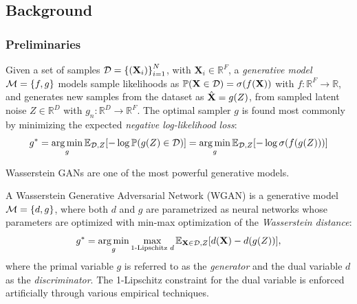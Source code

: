 
\subsection{Background}
\label{sec:background_gggcrp}

\subsubsection{Preliminaries}

\begin{definition}
    Given a set of samples $\mathcal{D}=\mathopen{}\left\{\mathopen{}\left(\mathbf{X}_i\right)\right\}_{i=1}^{N}$, with $\mathbf{X}_i \in \mathbb{R}^F$, a \emph{generative model} $\mathcal{M}=\mathopen{}\left\{f,g\right\}$ models sample likelihoods as $\mathbb{P}\mathopen{}\left(\mathbf{X} \in \mathcal{D}\right)=\sigma\mathopen{}\left(f\mathopen{}\left(\mathbf{X}\right)\right)$ with $f: \mathbb{R}^F \to \mathbb{R}$, and generates new samples from the dataset as $\hat{\mathbf{X}}=g\mathopen{}\left(Z\right)$, from sampled latent noise $Z\in\mathbb{R}^D$ with $g_n:\mathbb{R}^D \to \mathbb{R}^F$. The optimal sampler $g$ is found most commonly by minimizing the expected \emph{negative log-likelihood loss}:
    \begin{equation}
        g^*=\operatorname*{arg\,min}_{g}{\mathbb{E}_{\mathcal{D},Z}\mathopen{}\left[-\log{\mathbb{P}\mathopen{}\left(g\mathopen{}\left(Z\right) \in \mathcal{D}\right)}\right]}=\operatorname*{arg\,min}_{g}{\mathbb{E}_{\mathcal{D},Z}\mathopen{}\left[-\log{\sigma\mathopen{}\left(f\mathopen{}\left(g\mathopen{}\left(Z\right)\right)\right)}\right]}
    \end{equation}
\end{definition}

Wasserstein GANs are one of the most powerful generative models.

\begin{definition}
   A Wasserstein Generative Adversarial Network (WGAN) \cite{arjovsky_wasserstein_2017} is a generative model $\mathcal{M}=\mathopen{}\left\{d,g\right\}$, where both $d$ and $g$ are parametrized as neural networks whose parameters are optimized with min-max optimization of the \emph{Wasserstein distance}:
   $$g^*=\operatorname*{arg\,min}_{g}\max_{\text{1-Lipschitz } d}{\mathbb{E}_{\mathbf{X}\in\mathcal{D},Z}\mathopen{}\left[d\mathopen{}\left(\mathbf{X}\right)-d\mathopen{}\left(g\mathopen{}\left(Z\right)\right)\right]},$$
   where the primal variable $g$ is referred to as the \emph{generator} and the dual variable $d$ as the \emph{discriminator}. The 1-Lipschitz constraint for the dual variable is enforced artificially through various empirical techniques.
\end{definition}

